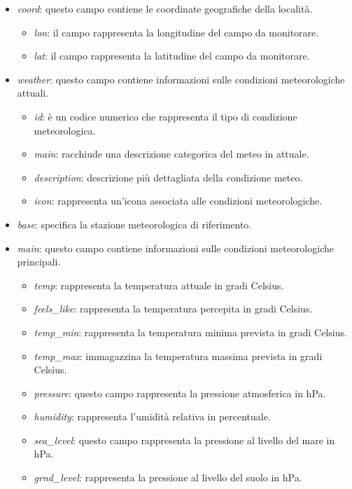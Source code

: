 \begin{itemize}
    \item \textit{coord}: questo campo contiene le coordinate geografiche della località.
    \begin{itemize}
        \item \textit{lon}: il campo rappresenta la longitudine del campo da monitorare.
        \item \textit{lat}: il campo rappresenta la latitudine del campo da monitorare.
    \end{itemize}

    \item \textit{weather}: questo campo contiene informazioni sulle condizioni meteorologiche attuali.
    \begin{itemize}
        \item \textit{id}: è un codice numerico che rappresenta il tipo di condizione meteorologica.
        \item \textit{main}: racchiude una descrizione categorica del meteo in attuale.
        \item \textit{description}: descrizione più dettagliata della condizione meteo.
        \item \textit{icon}: rappresenta un'icona associata alle condizioni meteorologiche.
    \end{itemize}
    \item \textit{base}: specifica la stazione meteorologica di riferimento.
    \item \textit{main}: questo campo contiene informazioni sulle condizioni meteorologiche principali.
    \begin{itemize}
        \item \textit{temp}: rappresenta la temperatura attuale in gradi Celsius.
        \item \textit{feels\_like}: rappresenta la temperatura percepita in gradi Celsius.
        \item \textit{temp\_min}: rappresenta la temperatura minima prevista in gradi Celsius.
        \item \textit{temp\_max}: immagazzina la temperatura massima prevista in gradi Celsius.
        \item \textit{pressure}: questo campo rappresenta la pressione atmosferica in hPa.
        \item \textit{humidity}: rappresenta l'umidità relativa in percentuale.
        \item \textit{sea\_level}: questo campo rappresenta la pressione al livello del mare in hPa.
        \item \textit{grnd\_level}: rappresenta la pressione al livello del suolo in hPa.
    \end{itemize}
        

\end{itemize}
